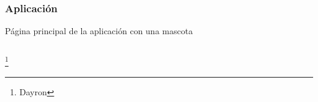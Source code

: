 \documentclass[14pt]{beamer}
\begin{document}
\begin{frame}
\frametitle{Aplicación}
Página principal de la aplicación con una mascota
\begin{columns}
\begin{column}{0.25\textwidth}
\begin{center}


\end{center}
\end{column}

\end{columns}
\footnote{Dayron}
\end{frame}
\end{document}
